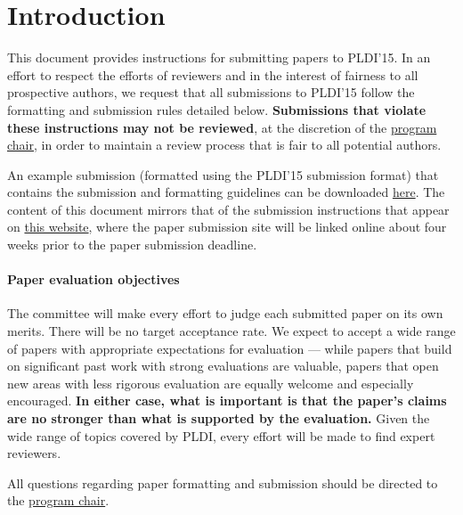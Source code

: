 \section{Introduction}

This document provides instructions for submitting papers to PLDI'15.
In an effort to respect the efforts of reviewers and in the interest
of fairness to all prospective authors, we request that all
submissions to PLDI'15 follow the formatting and submission rules
detailed below. \textbf{Submissions that violate these instructions
  may not be reviewed}, at the discretion of the
\href{mailto:steve.blackburn@anu.edu.au?subject=[PLDI'15]}{program
  chair}, in order to maintain a review process that is fair to all
potential authors.

An example submission (formatted using the PLDI'15 submission format)
that contains the submission and formatting guidelines can be
downloaded
\href{http://conf.researchr.org/getImage/pldi2015/orig/pldi15-template.pdf}{here}. The
content of this document mirrors that of the submission instructions
that appear on
\href{http://conf.researchr.org/track/pldi2015/pldi2015-papers#Submission-Instructions}{this website},
where the paper submission site will be linked online about four weeks
prior to the paper submission deadline.

\paragraph{Paper evaluation objectives}
The committee will make every effort to judge each submitted paper on
its own merits. There will be no target acceptance rate.  We expect to
accept a wide range of papers with appropriate expectations for
evaluation --- while papers that build on significant past work with
strong evaluations are valuable, papers that open new areas with less
rigorous evaluation are equally welcome and especially
encouraged. \textbf{In either case, what is important is that the
  paper's claims are no stronger than what is supported by the
  evaluation.}  Given the wide range of topics covered by PLDI, every
effort will be made to find expert reviewers.

All questions regarding paper formatting and submission should be
directed to the
\href{mailto:steve.blackburn@anu.edu.au?subject=[PLDI'15]}{program
  chair}.

